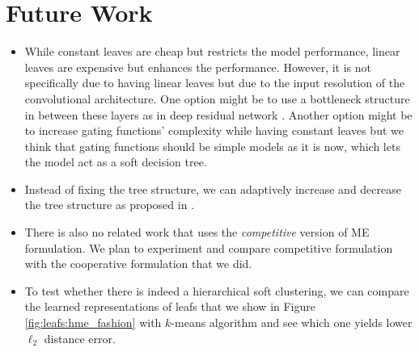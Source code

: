 \documentclass[a4paper,onesided,12pt]{report}
\begin{document}
\section{Future Work}
\label{sec:future}
\begin{itemize}
\item While constant leaves are cheap but restricts the model performance, linear leaves are expensive but enhances the performance. However, it is not specifically due to having linear leaves but due to the input resolution of the convolutional architecture. One option might be to use a bottleneck structure in between these layers as in deep residual network \cite{he2016identity}. Another option might be to increase gating functions' complexity while having constant leaves but we think that gating functions should be simple models as it is now, which lets the model act as a soft decision tree.

\item Instead of fixing the tree structure, we can adaptively increase and decrease the tree structure as proposed in \cite{irsoy2012soft,irsoy2014budding}.

\item There is also no related work that uses the \emph{competitive} version of ME formulation. We plan to experiment and compare competitive formulation with the cooperative formulation that we did.

\item To test whether there is indeed a hierarchical soft clustering, we can compare the learned representations of leafs that we show in Figure \ref{fig:leafs:hme_fashion} with $k$-means algorithm and see which one yields lower $\ell_2$ distance error.
\end{itemize}



\end{document}
